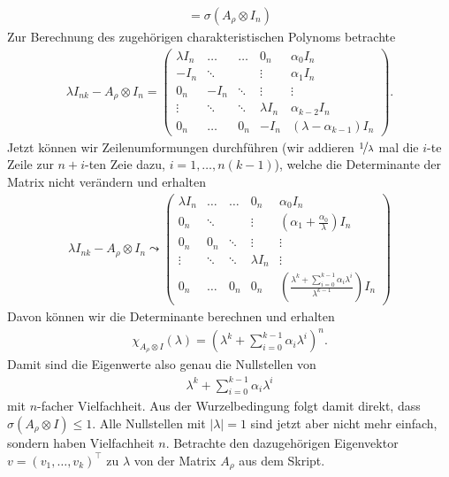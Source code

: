 \begin{solution}
\begin{align*}
  = \sigma(A_{\rho} \otimes I_n)
\end{align*}
Zur Berechnung des zugehörigen charakteristischen Polynoms betrachte
\begin{align*}
\lambda I_{nk} - A_{\rho} \otimes I_n = \begin{pmatrix}
\lambda I_n & \hdots & \hdots & 0_n & \alpha_0I_n \\
-I_n & \ddots & & \vdots & \alpha_1I_n \\
0_n & -I_n & \ddots & \vdots & \vdots \\
\vdots & \ddots & \ddots & \lambda I_n & \alpha_{k-2}I_n \\
0_n & \hdots & 0_n & -I_n & (\lambda-  \alpha_{k-1})I_n
\end{pmatrix}.
\end{align*}
Jetzt können wir Zeilenumformungen durchführen
(wir addieren $\nicefrac{1}{\lambda}$ mal die $i$-te Zeile zur $n+i$-ten Zeie dazu, $i = 1,\dots,n(k-1)$), welche die Determinante der
Matrix nicht verändern und erhalten
\begin{align*}
  \lambda I_{nk} - A_{\rho} \otimes I_n \leadsto
  \begin{pmatrix}
  \lambda I_n & \hdots & \hdots & 0_n & \alpha_0I_n \\
  0_n & \ddots & & \vdots & (\alpha_1 + \frac{\alpha_0}{\lambda})I_n \\
  0_n & 0_n & \ddots & \vdots & \vdots \\
  \vdots & \ddots & \ddots & \lambda I_n & \vdots \\
  0_n & \hdots & 0_n & 0_n & (\frac{\lambda^k + \sum_{i = 0}^{k-1}\alpha_i\lambda^i}{\lambda^{k-1}})I_n
  \end{pmatrix}
\end{align*}
Davon können wir die Determinante berechnen und erhalten
\begin{align*}
  \chi_{A_{\rho} \otimes I}(\lambda) =
  \left(\lambda^k + \sum_{i = 0}^{k-1}\alpha_i\lambda^i\right)^n.
\end{align*}
Damit sind die Eigenwerte also genau die Nullstellen von
\begin{align*}
  \lambda^k + \sum_{i = 0}^{k-1}\alpha_i\lambda^i
\end{align*}
mit $n$-facher Vielfachheit. Aus der Wurzelbedingung folgt damit direkt, dass
$\sigma(A_{\rho} \otimes I) \leq 1$. Alle Nullstellen mit $|\lambda| = 1$
sind jetzt aber nicht mehr einfach, sondern haben Vielfachheit $n$.
Betrachte den dazugehörigen Eigenvektor $v = (v_1,\dots,v_k)^{\top}$ zu $\lambda$ von der Matrix $A_{\rho}$ aus dem Skript.

\end{solution}
